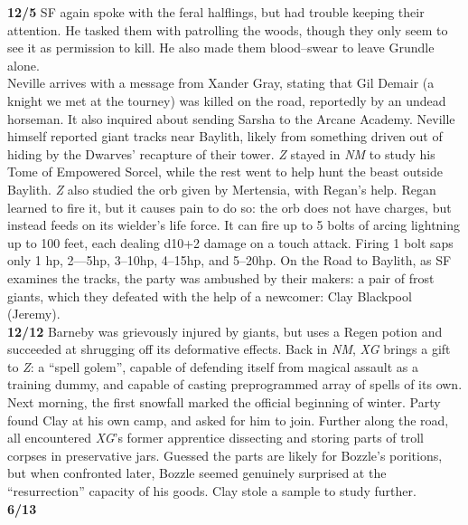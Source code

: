 \documentclass[letterpaper]{article}
\begin{document}
\noindent\textbf{12/5} SF again spoke with the feral halflings, but had trouble keeping their attention.  He tasked them with patrolling the woods, though they only seem to see it as permission to kill. He also made them blood--swear to leave Grundle alone.\\

\noindent Neville arrives with a message from Xander Gray, stating that Gil Demair (a knight we met at the tourney) was killed on the road, reportedly by an undead horseman. It also inquired about sending Sarsha to the Arcane Academy.  Neville himself reported giant tracks near Baylith, likely from something driven out of hiding by the Dwarves' recapture of their tower.  \emph{Z} stayed in \emph{NM} to study his Tome of Empowered Sorcel, while the rest went to help hunt the beast outside Baylith. \emph{Z} also studied the orb given by Mertensia, with Regan's help.  Regan learned to fire it, but it causes pain to do so: the orb does not have charges, but instead feeds on its wielder's life force.  It can fire up to 5 bolts of arcing lightning up to 100 feet, each dealing d10+2 damage on a touch attack.  Firing 1 bolt saps only 1 hp, 2---5hp, 3--10hp, 4--15hp, and 5--20hp.  On the Road to Baylith, as SF examines the tracks, the party was ambushed by their makers: a pair of frost giants, which they defeated with the help of a newcomer: Clay Blackpool (Jeremy).  \\

\noindent\textbf{12/12} Barneby was grievously injured by giants, but uses a Regen potion and succeeded at shrugging off its deformative effects. Back in \emph{NM}, \emph{XG} brings a gift to \emph{Z}: a ``spell golem'', capable of defending itself from magical assault as a training dummy, and capable of casting preprogrammed array of spells of its own.  \\

\noindent Next morning, the first snowfall marked the official beginning of winter.  Party found Clay at his own camp, and asked for him to join.  Further along the road, all encountered \emph{XG}'s former apprentice dissecting and storing parts of troll corpses in preservative jars.  Guessed the parts are likely for Bozzle's poritions, but when confronted later, Bozzle seemed genuinely surprised at the ``resurrection'' capacity of his goods.  Clay stole a sample to study further. \\

\noindent\textbf{6/13} \\
\end{document}
